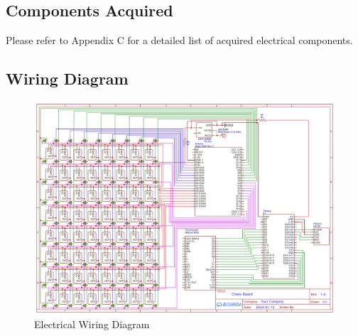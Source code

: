 \documentclass[12pt, titlepage]{article}
\begin{document}
\subsection{Components Acquired}
Please refer to Appendix C for a detailed list of acquired electrical components.

\subsection{Wiring Diagram}
\begin{figure}[H]
  \begin{center}
    \includegraphics[scale=0.45]{wiring_diagram.pdf}
    \caption{Electrical Wiring Diagram}
    \label{Fig_Wiring_Dgm} 
  \end{center}
\end{figure}
\end{document}
